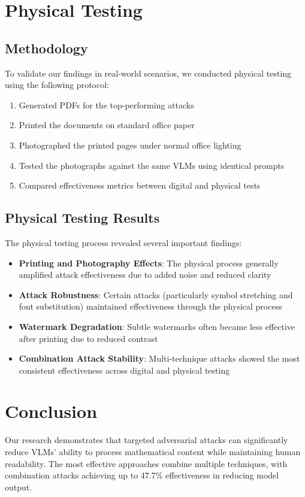 \documentclass[conference]{IEEEtran}
\begin{document}
\begin{enumerate}
\section{Physical Testing}
\subsection{Methodology}
To validate our findings in real-world scenarios, we conducted physical testing using the following protocol:

\begin{enumerate}
    \item Generated PDFs for the top-performing attacks
    \item Printed the documents on standard office paper
    \item Photographed the printed pages under normal office lighting
    \item Tested the photographs against the same VLMs using identical prompts
    \item Compared effectiveness metrics between digital and physical tests
\end{enumerate}

\subsection{Physical Testing Results}
The physical testing process revealed several important findings:

\begin{itemize}
    \item \textbf{Printing and Photography Effects}: The physical process generally amplified attack effectiveness due to added noise and reduced clarity
    \item \textbf{Attack Robustness}: Certain attacks (particularly symbol stretching and font substitution) maintained effectiveness through the physical process
    \item \textbf{Watermark Degradation}: Subtle watermarks often became less effective after printing due to reduced contrast
    \item \textbf{Combination Attack Stability}: Multi-technique attacks showed the most consistent effectiveness across digital and physical testing
\end{itemize}

\section{Conclusion}
Our research demonstrates that targeted adversarial attacks can significantly reduce VLMs' ability to process mathematical content while maintaining human readability. The most effective approaches combine multiple techniques, with combination attacks achieving up to 47.7\% effectiveness in reducing model output.


\end{enumerate}
\end{document}
